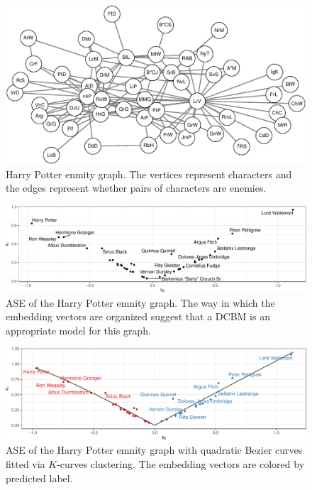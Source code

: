 \documentclass[
  11pt,
]{article}
\theoremstyle{definition}
\theoremstyle{definition}
\theoremstyle{definition}
\theoremstyle{definition}
\theoremstyle{remark}
\begin{document}
\begin{figure}[H]

{\centering \includegraphics{draft_files/figure-latex/hp-1} 

}

\caption{Harry Potter enmity graph. The vertices represent characters and the edges represent whether pairs of characters are enemies.}\label{fig:hp}
\end{figure}

\begin{figure}[H]

{\centering \includegraphics{draft_files/figure-latex/hp-ase-1} 

}

\caption{ASE of the Harry Potter emnity graph. The way in which the embedding vectors are organized suggest that a DCBM is an appropriate model for this graph.}\label{fig:hp-ase}
\end{figure}

\begin{figure}[H]

{\centering \includegraphics{draft_files/figure-latex/hp-kcurves-1} 

}

\caption{ASE of the Harry Potter emnity graph with quadratic Bezier curves fitted via $K$-curves clustering. The embedding vectors are colored by predicted label.}\label{fig:hp-kcurves}
\end{figure}
\end{document}
